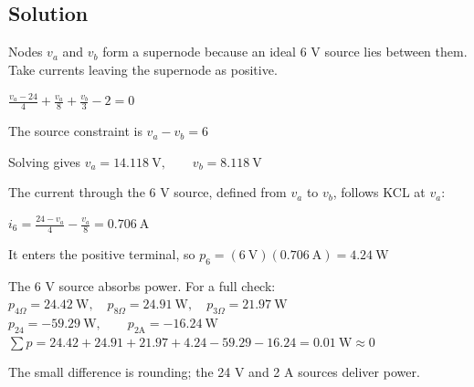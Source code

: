 \documentclass[11pt]{article}
\begin{document}
\subsection*{Solution}

Nodes $v_a$ and $v_b$ form a supernode because an ideal 6 V source lies between them. Take currents leaving the supernode as positive.\par

$\frac{v_a-24}{4}+\frac{v_a}{8}+\frac{v_b}{3}-2=0$\par

The source constraint is $v_a-v_b=6$\par

Solving gives $v_a=14.118\ \mathrm{V},\qquad v_b=8.118\ \mathrm{V}$\par

The current through the 6 V source, defined from $v_a$ to $v_b$, follows KCL at $v_a$:\par

$i_6=\frac{24-v_a}{4}-\frac{v_a}{8}=0.706\ \mathrm{A}$\par

It enters the positive terminal, so $p_6=(6\ \mathrm{V})(0.706\ \mathrm{A})=4.24\ \mathrm{W}$\par

The 6 V source absorbs power. For a full check: $p_{4\Omega}=24.42\ \mathrm{W},\quad p_{8\Omega}=24.91\ \mathrm{W},\quad p_{3\Omega}=21.97\ \mathrm{W}$ $p_{24}=-59.29\ \mathrm{W},\qquad p_{2\mathrm{A}}=-16.24\ \mathrm{W}$ $\sum p=24.42+24.91+21.97+4.24-59.29-16.24=0.01\ \mathrm{W}\approx0$\par

The small difference is rounding; the 24 V and 2 A sources deliver power.\par
\end{document}
